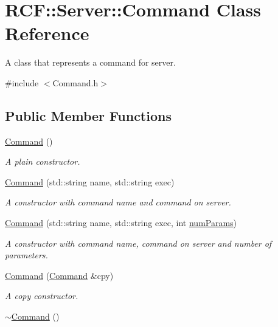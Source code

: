 \hypertarget{class_r_c_f_1_1_server_1_1_command}{}\section{R\+C\+F\+:\+:Server\+:\+:Command Class Reference}
\label{class_r_c_f_1_1_server_1_1_command}


A class that represents a command for server.  




{\ttfamily \#include $<$Command.\+h$>$}

\subsection*{Public Member Functions}
\begin{DoxyCompactItemize}
\item 
\hypertarget{class_r_c_f_1_1_server_1_1_command_a34954d22d17925a4f1b4d74d5d0521a0}{}\hyperlink{class_r_c_f_1_1_server_1_1_command_a34954d22d17925a4f1b4d74d5d0521a0}{Command} ()\label{class_r_c_f_1_1_server_1_1_command_a34954d22d17925a4f1b4d74d5d0521a0}

\begin{DoxyCompactList}\small\item\em A plain constructor. \end{DoxyCompactList}\item 
\hyperlink{class_r_c_f_1_1_server_1_1_command_a4c1065c5b99b306580cac7ace67f63ac}{Command} (std\+::string name, std\+::string exec)
\begin{DoxyCompactList}\small\item\em A constructor with command name and command on server. \end{DoxyCompactList}\item 
\hyperlink{class_r_c_f_1_1_server_1_1_command_a948f35436d5013c2501c128e960953b3}{Command} (std\+::string name, std\+::string exec, int \hyperlink{class_r_c_f_1_1_server_1_1_command_a99a2d8045b47d6c7d7515d02d0e547ea}{num\+Params})
\begin{DoxyCompactList}\small\item\em A constructor with command name, command on server and number of parameters. \end{DoxyCompactList}\item 
\hyperlink{class_r_c_f_1_1_server_1_1_command_a7c73aa98349c8dd9f86aa438c70b7c34}{Command} (\hyperlink{class_r_c_f_1_1_server_1_1_command}{Command} \&cpy)
\begin{DoxyCompactList}\small\item\em A copy constructor. \end{DoxyCompactList}\item 
\hypertarget{class_r_c_f_1_1_server_1_1_command_abe123f192bc818a1dcb31a7006eff52c}{}\hyperlink{class_r_c_f_1_1_server_1_1_command_abe123f192bc818a1dcb31a7006eff52c}{$\sim$\+Command} ()\label{class_r_c_f_1_1_server_1_1_command_abe123f192bc818a1dcb31a7006eff52c}


\end{DoxyCompactItemize}
